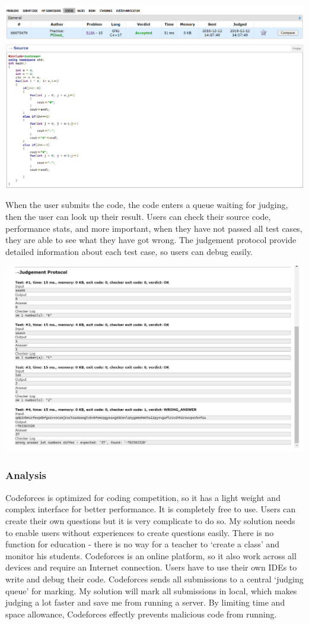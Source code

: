 \documentclass[a4paper]{report}
\begin{document}
\includegraphics[width=\linewidth]{Submission-66675479-Codeforces}

When the user submits the code, the code enters a queue waiting for judging, then the user can look up their result. Users can check their source code, performance stats, and more important, when they have not passed all test cases, they are able to see what they have got wrong. The judgement protocol provide detailed information about each test case, so users can debug easily.

\includegraphics[width=\linewidth]{Judgement-Protocol-Codeforces}

\subsubsection{Analysis}

Codeforces is optimized for coding competition, so it has a light weight and complex interface for better performance. It is completely free to use. Users can create their own questions but it is very complicate to do so. My solution needs to enable users without experiences to create questions easily. There is no function for education - there is no way for a teacher to `create a class' and monitor his students. Codeforces is an online platform, so it also work across all devices and require an Internet connection. Users have to use their own IDEs to write and debug their code. Codeforces sends all submissions to a central `judging queue' for marking. My solution will mark all submissions in local, which makes judging a lot faster and save me from running a server. By limiting time and space allowance, Codeforces effectly prevents malicious code from running.
\end{document}
